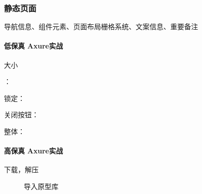 \documentclass[letterpaper,10pt,english]{sphinxmanual}
\begin{document}
\subsubsection{静态页面}
\label{\detokenize{chapter_knowledge/static_page:id1}}\label{\detokenize{chapter_knowledge/static_page::doc}}
导航信息、组件元素、页面布局\sphinxhyphen{}栅格系统、文案信息、重要备注
%
\begin{footnote}[607]\sphinxAtStartFootnote
{}
%
\end{footnote}


\paragraph{低保真 Axure实战}
\label{\detokenize{chapter_knowledge/static_page:axure}}\label{\detokenize{chapter_knowledge/static_page:page-axure}}
大小 %
\begin{footnote}[608]\sphinxAtStartFootnote
{}
%
\end{footnote}：
\begin{center}\end{center}

锁定： \begin{center}\end{center}

关闭按钮： \begin{center}\end{center}

整体： \begin{center}\end{center}


\paragraph{高保真 Axure实战}
\label{\detokenize{chapter_knowledge/static_page:page-done-axure}}\label{\detokenize{chapter_knowledge/static_page:id2}}

下载，解压

\begin{figure}[H]
\centering
\capstart

\noindent{}
\caption{导入原型库}\label{\detokenize{chapter_knowledge/static_page:id9}}\end{figure}
\end{document}
